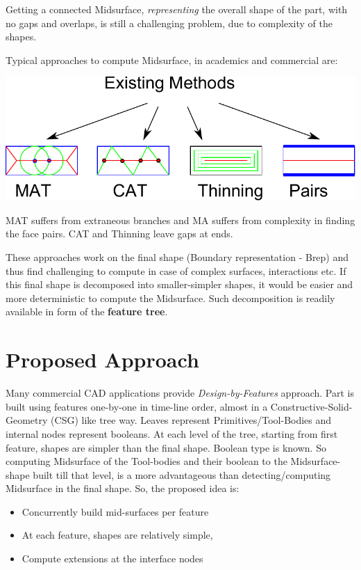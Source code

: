 Getting a connected Midsurface, {\em representing} the overall shape of the part, with no gaps and overlaps, is still a challenging problem, due to complexity of the shapes. 

Typical approaches to compute Midsurface, in academics and commercial are: 

\vspace{1em}

\includegraphics[width=0.7\linewidth]{../Common/images/MedialMethodsOnly.pdf}

MAT suffers from extraneous branches and MA suffers from complexity in finding the face pairs. CAT and Thinning leave gaps at ends.

These approaches work on the final shape (Boundary representation - Brep) and thus find challenging to compute in case of complex surfaces, interactions etc. If this final shape is decomposed into smaller-simpler shapes, it would be easier and more deterministic to compute the Midsurface. Such decomposition is readily available in form of the \textbf{feature tree}.

\vspace{1em}


\section{Proposed Approach}
Many commercial CAD applications provide {\em Design-by-Features} approach. Part is built using features one-by-one in time-line order, almost in a Constructive-Solid-Geometry (CSG) like tree way. Leaves represent  Primitives/Tool-Bodies and internal nodes represent booleans. At each level of the tree, starting from first feature, shapes are simpler than the final shape. Boolean type is known. So computing Midsurface of the Tool-bodies and their boolean to the Midsurface-shape built till that level, is a more advantageous than detecting/computing Midsurface in the final shape. So, the proposed idea is:

\begin{itemize}[noitemsep,nolistsep]
		\item Concurrently build mid-surfaces per feature
		\item At each feature, shapes are relatively simple, 
		\item Compute extensions at the interface nodes
\end{itemize}

